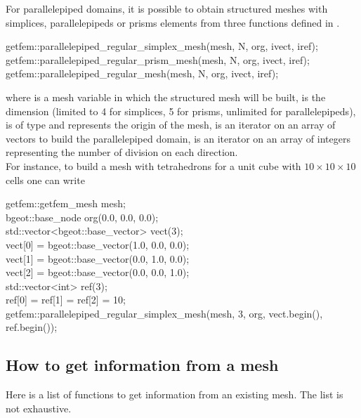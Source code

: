 \documentclass[11pt,a4paper]{article}
\begin{document}
For parallelepiped domains, it is possible to obtain structured meshes with simplices, parallelepipeds or prisms elements from three functions defined in . \\[0.5cm]
\begin{cppcode}
  getfem::parallelepiped\_regular\_simplex\_mesh(mesh, N, org, ivect, iref); \\
  getfem::parallelepiped\_regular\_prism\_mesh(mesh, N, org, ivect, iref); \\
  getfem::parallelepiped\_regular\_mesh(mesh, N, org, ivect, iref);
\end{cppcode}
where  is a mesh variable in which the structured mesh will be built,  is the dimension (limited to 4 for simplices, 5 for prisms, unlimited for parallelepipeds),  is of type  and represents the origin of the mesh,  is an iterator on an array of  vectors to build the parallelepiped domain,  is an iterator on an array of  integers representing the number of division on each direction. \\[0.5cm]
For instance, to build a mesh with tetrahedrons for a unit cube with $10\times10\times10$ cells one can write\\[0.5cm]
\begin{cppcode}
  getfem::getfem\_mesh mesh; \\
  bgeot::base\_node org(0.0, 0.0, 0.0); \\
  std::vector<bgeot::base\_vector> vect(3); \\
  vect[0] = bgeot::base\_vector(1.0, 0.0, 0.0); \\
  vect[1] = bgeot::base\_vector(0.0, 1.0, 0.0); \\
  vect[2] = bgeot::base\_vector(0.0, 0.0, 1.0); \\
  std::vector<int> ref(3); \\
  ref[0] = ref[1] = ref[2] = 10; \\
  getfem::parallelepiped\_regular\_simplex\_mesh(mesh, 3, org, vect.begin(), ref.begin()); 
\end{cppcode}


\subsection{How to get information from a mesh}

Here is a list of functions to get information from an existing mesh. The list is not exhaustive.
\end{document}
